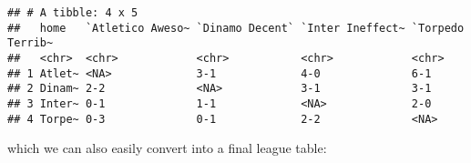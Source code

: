 \documentclass[]{article}
\newenvironment{Shaded}{\begin{snugshade}}{\end{snugshade}}
\newcommand{\KeywordTok}[1]{\textcolor[rgb]{0.13,0.29,0.53}{\textbf{#1}}}
\newcommand{\DataTypeTok}[1]{\textcolor[rgb]{0.13,0.29,0.53}{#1}}
\newcommand{\StringTok}[1]{\textcolor[rgb]{0.31,0.60,0.02}{#1}}
\newcommand{\ControlFlowTok}[1]{\textcolor[rgb]{0.13,0.29,0.53}{\textbf{#1}}}
\newcommand{\OperatorTok}[1]{\textcolor[rgb]{0.81,0.36,0.00}{\textbf{#1}}}
\newcommand{\NormalTok}[1]{#1}
\begin{document}
\begin{Shaded}
\end{Shaded}

\begin{verbatim}
## # A tibble: 4 x 5
##   home   `Atletico Aweso~ `Dinamo Decent` `Inter Ineffect~ `Torpedo Terrib~
##   <chr>  <chr>            <chr>           <chr>            <chr>           
## 1 Atlet~ <NA>             3-1             4-0              6-1             
## 2 Dinam~ 2-2              <NA>            3-1              3-1             
## 3 Inter~ 0-1              1-1             <NA>             2-0             
## 4 Torpe~ 0-3              0-1             2-2              <NA>
\end{verbatim}

which we can also easily convert into a final league table:
\end{document}
